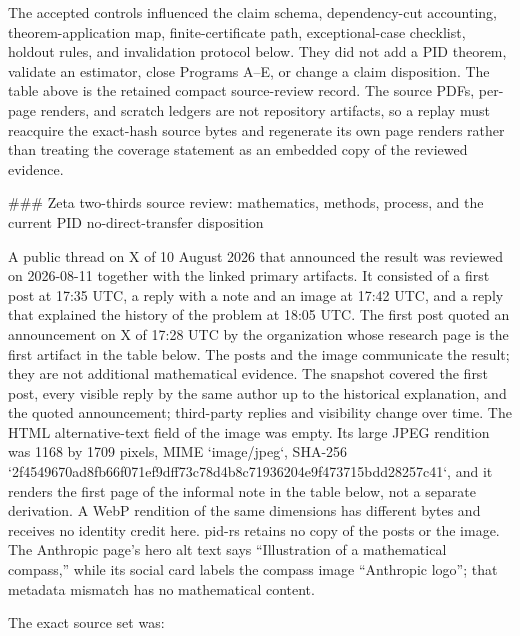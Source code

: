 \documentclass[11pt]{article}
\begin{document}
\begin{markdown}
The accepted controls influenced the claim schema, dependency-cut accounting, theorem-application
map, finite-certificate path, exceptional-case checklist, holdout rules, and invalidation protocol
below. They did not add a PID theorem, validate an estimator, close Programs A--E, or change a claim
disposition. The table above is the retained compact source-review record. The source PDFs,
per-page renders, and scratch ledgers are not repository artifacts, so a replay must reacquire the
exact-hash source bytes and regenerate its own page renders rather than treating the coverage
statement as an embedded copy of the reviewed evidence.

### Zeta two-thirds source review: mathematics, methods, process, and the current PID no-direct-transfer disposition

A public thread on X of 10 August 2026 that announced the result was reviewed on 2026-08-11
together with the linked primary artifacts. It consisted of a first post at 17:35 UTC, a reply with
a note and an image at 17:42 UTC, and a reply that explained the history of the problem at 18:05
UTC. The first post quoted an announcement on X of 17:28 UTC by the organization whose research
page is the first artifact in the table below. The posts and the image communicate the result; they
are not additional mathematical evidence. The snapshot covered the first post, every visible reply
by the same author up to the historical explanation, and the quoted announcement; third-party
replies and visibility change over time. The HTML alternative-text field of the image was empty.
Its large JPEG rendition was 1168 by 1709 pixels, MIME `image/jpeg`, SHA-256
`2f4549670ad8fb66f071ef9dff73c78d4b8c71936204e9f473715bdd28257c41`, and it renders the first page
of the informal note in the table below, not a separate derivation. A WebP rendition of the same
dimensions has different bytes and receives no identity credit here. pid-rs retains no copy of the
posts or the image. The Anthropic page's hero alt text says “Illustration of a mathematical
compass,” while its social card labels the compass image “Anthropic logo”; that metadata mismatch
has no mathematical content.

The exact source set was:


\end{markdown}
\end{document}
